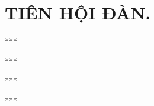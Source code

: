\chapter{\uppercase{Tiên hội đàn.}}



\begin{center}
  ***
\end{center}



\begin{center}
  ***
\end{center}



\begin{center}
  ***
\end{center}



\begin{center}
  ***
\end{center}
